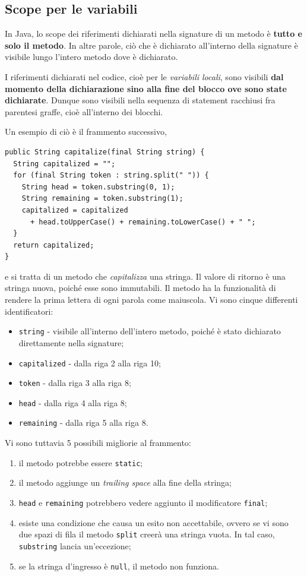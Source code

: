 \documentclass[\fontsizeclass,twocolumn]{\classname}
\theoremstyle{definition}
\theoremstyle{definition}
\begin{document}
\subsection{Scope per le variabili}

In Java, lo scope dei riferimenti dichiarati nella signature di un metodo è
\textbf{tutto e solo il metodo}. In altre parole, ciò che è dichiarato
all'interno della signature è visibile lungo l'intero metodo dove è dichiarato.

I riferimenti dichiarati nel codice, cioè per le \emph{variabili locali}, sono
visibili \textbf{dal momento della dichiarazione sino alla fine del blocco ove
sono state dichiarate}. Dunque sono visibili nella sequenza di statement
racchiusi fra parentesi graffe, cioè all'interno dei blocchi.

Un esempio di ciò è il frammento successivo,


\begin{lstlisting}
public String capitalize(final String string) {
  String capitalized = "";
  for (final String token : string.split(" ")) {
    String head = token.substring(0, 1);
    String remaining = token.substring(1);
    capitalized = capitalized
      + head.toUpperCase() + remaining.toLowerCase() + " ";
  }
  return capitalized;
}
\end{lstlisting}

e si tratta di un metodo che \emph{capitalizza} una stringa. Il valore di
ritorno è una stringa nuova, poiché esse sono immutabili. Il metodo ha la
funzionalità di rendere la prima lettera di ogni parola come maiuscola. Vi sono
cinque differenti identificatori:
\begin{itemize}
    \item \texttt{string} \-- visibile all'interno dell'intero metodo, poiché è
        stato dichiarato direttamente nella signature;
    \item \texttt{capitalized} \-- dalla riga 2 alla riga 10;
    \item \texttt{token} \-- dalla riga 3 alla riga 8;
    \item \texttt{head} \-- dalla riga 4 alla riga 8;
    \item \texttt{remaining} \-- dalla riga 5 alla riga 8.
\end{itemize}

Vi sono tuttavia 5 possibili migliorie al frammento:
\begin{enumerate}
    \item il metodo potrebbe essere \texttt{static};
    \item il metodo aggiunge un \emph{trailing space} alla fine della stringa;
    \item \texttt{head} e \texttt{remaining} potrebbero vedere aggiunto il
        modificatore \texttt{final};
    \item esiste una condizione che causa un esito non accettabile, ovvero se
        vi sono due spazi di fila il metodo \texttt{split} creerà una stringa
        vuota. In tal caso, \texttt{substring} lancia un'eccezione;
    \item se la stringa d'ingresso è \texttt{null}, il metodo non funziona.
\end{enumerate}
\end{document}

